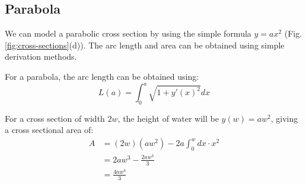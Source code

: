 \documentclass[12pt]{article}
\begin{document}
\subsection{Parabola}
\label{appendix:parabola}
We can model a parabolic cross section by using the simple formula $y = ax^2$ (Fig. \ref{fig:cross-sections}(d)). The arc length and area can be obtained using simple derivation methods.

For a parabola, the arc length can be obtained using:
\begin{equation}
    L(a) = \int_0^a\sqrt{1 + y'(x)^2}dx
\end{equation}

For a cross section of width $2w$, the height of water will be $y(w) = aw^2$, giving a cross sectional area of:
\begin{equation}
    \begin{split}
        A &= (2w)(aw^2) - 2a\int_0^w dx \cdot x^2
        \\ &=2aw^3 - \frac{2aw^3}{3}
        \\ &=\frac{4aw^3}{3}
    \end{split}
\end{equation}
\end{document}
